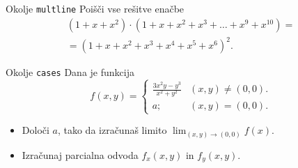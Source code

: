\begin{frame}{Okolje \texttt{multline}}
	Poišči vse rešitve enačbe
\begin{multline*}
	(1+x+x^2) \cdot (1+x+x^2+x^3+\ldots+x^9+x^{10}) = \\
	=(1+x+x^2+x^3+x^4+x^5+x^6)^2.
\end{multline*}     %

\end{frame}

\begin{frame}{Okolje \texttt{cases}}
	Dana je funkcija
	$$
		f(x,y)= \begin{cases}
			\frac{3x^2y-y^3}{x^2+y^2} & (x,y) \ne (0,0). \\
			a; & (x,y) = (0,0).
		\end{cases}
	$$	
	\begin{itemize}
	\item Določi $a$, tako da izračunaš limito \( \lim_{(x,y)\to(0,0)} f(x). \)
	\item Izračunaj parcialna odvoda $f_x(x,y)$ in $f_y(x,y)$.
	\end{itemize}
\end{frame}
